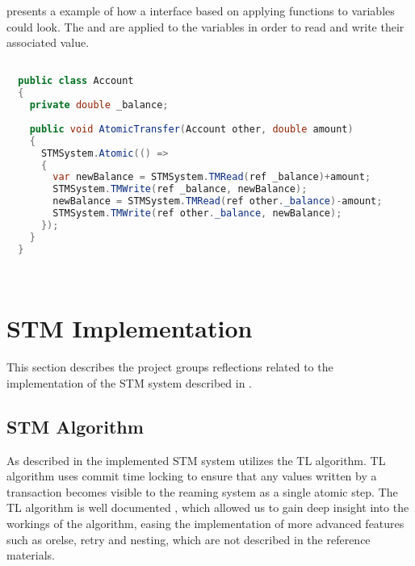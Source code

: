  presents a example of how a  interface based on applying functions to variables could look. The  and  are applied to the  variables in order to read and write their associated value. 

\begin{lstlisting}[float,label=lst:lib_function_interface,
  caption={\ac{STM} library interfaced based on applying functions},
  language=Java,  
  showspaces=false,
  showtabs=false,
  breaklines=true,
  showstringspaces=false,
  breakatwhitespace=true,
  escapechar=~,
  commentstyle=\color{greencomments},
  keywordstyle=\color{bluekeywords},
  stringstyle=\color{redstrings},
  morekeywords={atomic, retry, orelse, var, get, set, ref, out}]  % Start your code-block

  public class Account
  {
  	private double _balance;
  	
    public void AtomicTransfer(Account other, double amount)
    {
      STMSystem.Atomic(() =>
      {
      	var newBalance = STMSystem.TMRead(ref _balance)+amount;
      	STMSystem.TMWrite(ref _balance, newBalance);
      	newBalance = STMSystem.TMRead(ref other._balance)-amount;
      	STMSystem.TMWrite(ref other._balance, newBalance);
      });
    }
  }

  
\end{lstlisting}
 
\section{STM Implementation}\label{sec:reflection_stm_implementation}
This section describes the project groups reflections related to the implementation of the \ac{STM} system described in .

\subsection{STM Algorithm}
As described in  the implemented \ac{STM} system utilizes the TL algorithm\cite{dice2006transactional}. TL algorithm uses commit time locking to ensure that any values written by a transaction becomes visible to the reaming system as a single atomic step. The TL algorithm is well documented \cite{dice2006transactional}\cite[p. 438]{herlihy2012art}\cite[p. 106]{harris2010transactional}, which allowed us to gain deep insight into the workings of the algorithm, easing the implementation of more advanced features such as orelse, retry and nesting, which are not described in the reference materials.

